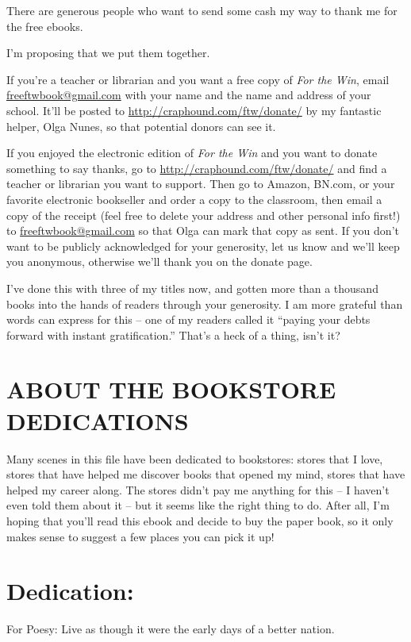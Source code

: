 There are generous people who want to send some cash my way to
thank me for the free ebooks.

I'm proposing that we put them together.

If you're a teacher or librarian and you want a free copy of
\emph{For the Win}, email
\url{freeftwbook@gmail.com} with
your name and the name and address of your school. It'll be posted
to
\url{http://craphound.com/ftw/donate/}
by my fantastic helper, Olga Nunes, so that potential donors can
see it.

If you enjoyed the electronic edition of \emph{For the Win} and you
want to donate something to say thanks, go to
\url{http://craphound.com/ftw/donate/}
and find a teacher or librarian you want to support. Then go to
Amazon, BN.com, or your favorite electronic bookseller and order a
copy to the classroom, then email a copy of the receipt (feel free
to delete your address and other personal info first!) to
\url{freeftwbook@gmail.com} so that
Olga can mark that copy as sent. If you don't want to be publicly
acknowledged for your generosity, let us know and we'll keep you
anonymous, otherwise we'll thank you on the donate page.

I've done this with three of my titles now, and gotten more than a
thousand books into the hands of readers through your generosity. I
am more grateful than words can express for this -- one of my
readers called it ``paying your debts forward with instant
gratification.'' That's a heck of a thing, isn't it?

\section{ABOUT THE BOOKSTORE DEDICATIONS}

Many scenes in this file have been dedicated to bookstores: stores
that I love, stores that have helped me discover books that opened
my mind, stores that have helped my career along. The stores didn't
pay me anything for this -- I haven't even told them about it --
but it seems like the right thing to do. After all, I'm hoping that
you'll read this ebook and decide to buy the paper book, so it only
makes sense to suggest a few places you can pick it up!

\section{Dedication:}

For Poesy: Live as though it were the early days of a better
nation.

